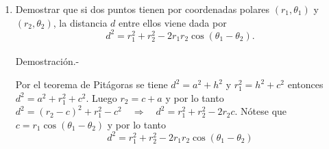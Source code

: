 \begin{enumerate}

    \item Demostrar que si dos puntos tienen por coordenadas polares $(r_1,\theta_1)$ y $(r_2,\theta_2)$, la distancia $d$ entre ellos viene dada por $$d^2 = r_1^2 + r_2^2 - 2r_1 r_2 \cos(\theta_1 - \theta_2).$$\\
	Demostración.-\; 
	\begin{center}
	\end{center}
	Por el teorema de Pitágoras se tiene $d^2 = a^2 + h^2$ y $r_1^2 = h^2 + c^2$ entonces $d^2 = a^2 + r_1^2 + c^2$. Luego $r_2 = c+a$ y por lo tanto $d^2 =  (r_2 - c)^2 + r_1^2 - c^2 \quad  \Rightarrow \quad d^2 = r_1^2 + r_2^2 - 2r_2c$. Nótese que $c=r_1\cos(\theta_1-\theta_2)$ y por lo tanto $$d^2 = r_1^2 + r_2^2 - 2r_1 r_2 \cos(\theta_1 - \theta_2)$$\\

\end{enumerate}
